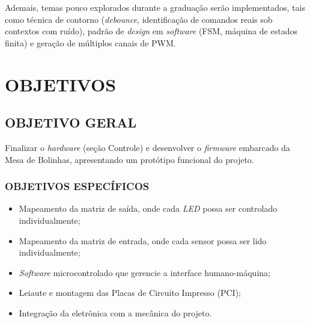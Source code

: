   Ademais, temas pouco explorados durante a graduação serão implementados, tais como técnica de contorno (\emph{debounce}, identificação de comandos reais sob contextos com ruído), padrão de \emph{design} em \emph{software} (FSM, máquina de estados finita) e geração de múltiplos canais de PWM.

\section{OBJETIVOS}
\label{sec:objetivos}

\subsection{OBJETIVO GERAL}
Finalizar o \emph{hardware} (seção Controle) e desenvolver o \emph{firmware} embarcado da Mesa de Bolinhas, apresentando um protótipo funcional do projeto.

\subsubsection{OBJETIVOS ESPECÍFICOS}
  \begin{itemize}
      \item Mapeamento da matriz de saída, onde cada \emph{LED} possa ser controlado individualmente;
      \item Mapeamento da matriz de entrada, onde cada sensor possa ser lido individualmente;
      \item \emph{Software} microcontrolado que gerencie a interface humano-máquina;
      \item Leiaute e montagem das Placas de Circuito Impresso (PCI);
      \item Integração da eletrônica com a mecânica do projeto.
  \end{itemize}
